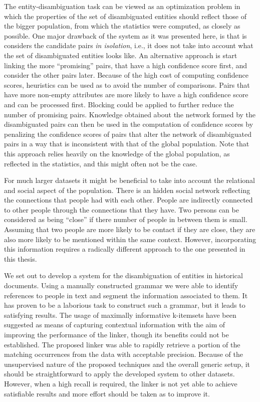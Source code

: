 The entity-disambiguation task can be viewed as an optimization problem in which the properties of the set of disambiguated entities should reflect those of the bigger population, from which the statistics were computed, as closely as possible.
One major drawback of the system as it was presented here, is that is considers the candidate pairs \emph{in isolation}, i.e., it does not take into account what the set of disambiguated entities looks like.
An alternative approach is start linking the more ``promising'' pairs, that have a high confidence score first, and consider the other pairs later.
Because of the high cost of computing confidence scores, heuristics can be used as to avoid the number of comparisons.
Pairs that have more non-empty attributes are more likely to have a high confidence score and can be processed first.
Blocking could be applied to further reduce the number of promising pairs.
Knowledge obtained about the network formed by the disambiguated pairs can then be used in the computation of confidence scores by penalizing the confidence scores of pairs that alter the network of disambiguated pairs in a way that is inconsistent with that of the global population.
Note that this approach relies heavily on the knowledge of the global population, as reflected in the statistics, and this might often not be the case.

For much larger datasets it might be beneficial to take into account the relational and social aspect of the population.
There is an hidden social network reflecting the connections that people had with each other.
People are indirectly connected to other people through the connections that they have.
Two persons can be considered as being ``close'' if there number of people in between them is small.
Assuming that two people are more likely to be contact if they are close, they are also more likely to be mentioned within the same context.
However, incorporating this information requires a radically different approach to the one presented in this thesis.

We set out to develop a system for the disambiguation of entities in historical documents.
Using a manually constructed grammar we were able to identify references to people in text and segment the information associated to them.
It has proven to be a laborious task to construct such a grammar, but it leads to satisfying results.
The usage of maximally informative k-itemsets have been suggested as means of capturing contextual information with the aim of improving the performance of the linker, though its benefits could not be established.
The proposed linker was able to rapidly retrieve a portion of the matching occurrences from the data with acceptable precision.
Because of the unsupervised nature of the proposed techniques and the overall generic setup, it should be straightforward to apply the developed system to other datasets.
However, when a high recall is required, the linker is not yet able to achieve satisfiable results and more effort should be taken as to improve it.